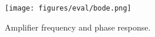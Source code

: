 \begin{figure}[t]
\centering
\texttt{[image: figures/eval/bode.png]}
\caption{Amplifier frequency and phase response.}
\label{fig:bodeplot}
\end{figure}



